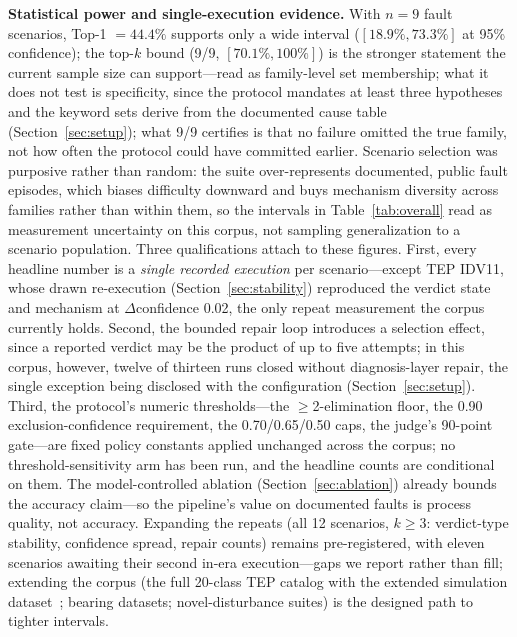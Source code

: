 \documentclass[preprint,10pt]{elsarticle}
\begin{document}
\textbf{Statistical power and single-execution evidence.} With $n{=}9$ fault scenarios, Top-1 $=44.4\%$ supports only a wide interval ($[18.9\%,73.3\%]$ at 95\% confidence); the top-$k$ bound (9/9, $[70.1\%,100\%]$) is the stronger statement the current sample size can support---read as family-level set membership; what it does not test is specificity, since the protocol mandates at least three hypotheses and the keyword sets derive from the documented cause table (Section~\ref{sec:setup}); what 9/9 certifies is that no failure omitted the true family, not how often the protocol could have committed earlier. Scenario selection was purposive rather than random: the suite over-represents documented, public fault episodes, which biases difficulty downward and buys mechanism diversity across families rather than within them, so the intervals in Table~\ref{tab:overall} read as measurement uncertainty on this corpus, not sampling generalization to a scenario population. Three qualifications attach to these figures. First, every headline number is a \emph{single recorded execution} per scenario---except TEP IDV11, whose drawn re-execution (Section~\ref{sec:stability}) reproduced the verdict state and mechanism at $\Delta$confidence 0.02, the only repeat measurement the corpus currently holds. Second, the bounded repair loop introduces a selection effect, since a reported verdict may be the product of up to five attempts; in this corpus, however, twelve of thirteen runs closed without diagnosis-layer repair, the single exception being disclosed with the configuration (Section~\ref{sec:setup}). Third, the protocol's numeric thresholds---the $\ge$2-elimination floor, the 0.90 exclusion-confidence requirement, the 0.70/0.65/0.50 caps, the judge's 90-point gate---are fixed policy constants applied unchanged across the corpus; no threshold-sensitivity arm has been run, and the headline counts are conditional on them. The model-controlled ablation (Section~\ref{sec:ablation}) already bounds the accuracy claim---so the pipeline's value on documented faults is process quality, not accuracy. Expanding the repeats (all 12 scenarios, $k\ge3$: verdict-type stability, confidence spread, repair counts) remains pre-registered, with eleven scenarios awaiting their second in-era execution---gaps we report rather than fill; extending the corpus (the full 20-class TEP catalog with the extended simulation dataset~\cite{reinartz2021extended}; bearing datasets; novel-disturbance suites) is the designed path to tighter intervals.
\end{document}

